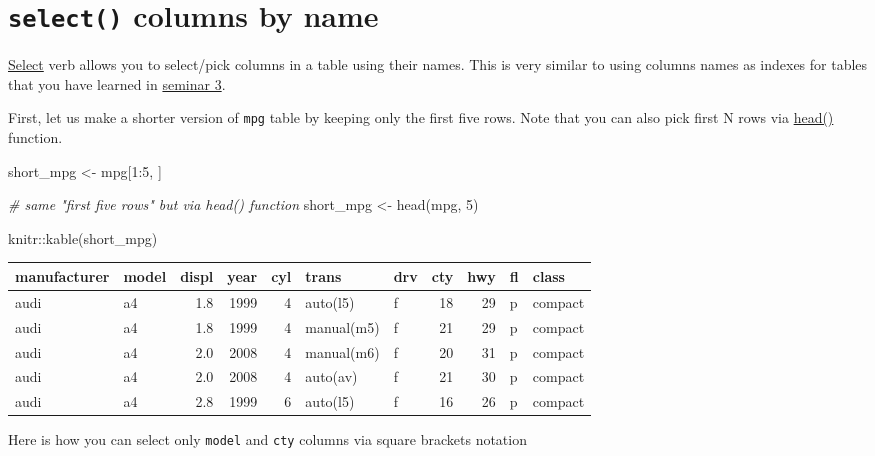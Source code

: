 \documentclass[
]{book}
\newenvironment{Shaded}{\begin{snugshade}}{\end{snugshade}}
\newcommand{\CommentTok}[1]{\textcolor[rgb]{0.56,0.35,0.01}{\textit{#1}}}
\newcommand{\DecValTok}[1]{\textcolor[rgb]{0.00,0.00,0.81}{#1}}
\newcommand{\FunctionTok}[1]{\textcolor[rgb]{0.00,0.00,0.00}{#1}}
\newcommand{\NormalTok}[1]{#1}
\newcommand{\OtherTok}[1]{\textcolor[rgb]{0.56,0.35,0.01}{#1}}
\newcommand{\SpecialCharTok}[1]{\textcolor[rgb]{0.00,0.00,0.00}{#1}}
\begin{document}
\hypertarget{select}{%
\section{\texorpdfstring{\texttt{select()} columns by name}{select() columns by name}}\label{select}}

\href{https://dplyr.tidyverse.org/reference/select.html}{Select} verb allows you to select/pick columns in a table using their names. This is very similar to using columns names as indexes for tables that you have learned in \protect\hyperlink{table-indexing}{seminar 3}.

First, let us make a shorter version of \texttt{mpg} table by keeping only the first five rows. Note that you can also pick first N rows via \href{https://stat.ethz.ch/R-manual/R-devel/library/utils/html/head.html}{head()} function.

\begin{Shaded}
\begin{Highlighting}[]
\NormalTok{short\_mpg }\OtherTok{\textless{}{-}}\NormalTok{ mpg[}\DecValTok{1}\SpecialCharTok{:}\DecValTok{5}\NormalTok{, ]}

\CommentTok{\# same "first five rows" but via head() function}
\NormalTok{short\_mpg }\OtherTok{\textless{}{-}} \FunctionTok{head}\NormalTok{(mpg, }\DecValTok{5}\NormalTok{)}

\NormalTok{knitr}\SpecialCharTok{::}\FunctionTok{kable}\NormalTok{(short\_mpg)}
\end{Highlighting}
\end{Shaded}

\begin{tabular}{l|l|r|r|r|l|l|r|r|l|l}
\hline
manufacturer & model & displ & year & cyl & trans & drv & cty & hwy & fl & class\\
\hline
audi & a4 & 1.8 & 1999 & 4 & auto(l5) & f & 18 & 29 & p & compact\\
\hline
audi & a4 & 1.8 & 1999 & 4 & manual(m5) & f & 21 & 29 & p & compact\\
\hline
audi & a4 & 2.0 & 2008 & 4 & manual(m6) & f & 20 & 31 & p & compact\\
\hline
audi & a4 & 2.0 & 2008 & 4 & auto(av) & f & 21 & 30 & p & compact\\
\hline
audi & a4 & 2.8 & 1999 & 6 & auto(l5) & f & 16 & 26 & p & compact\\
\hline
\end{tabular}

Here is how you can select only \texttt{model} and \texttt{cty} columns via square brackets notation
\end{document}
